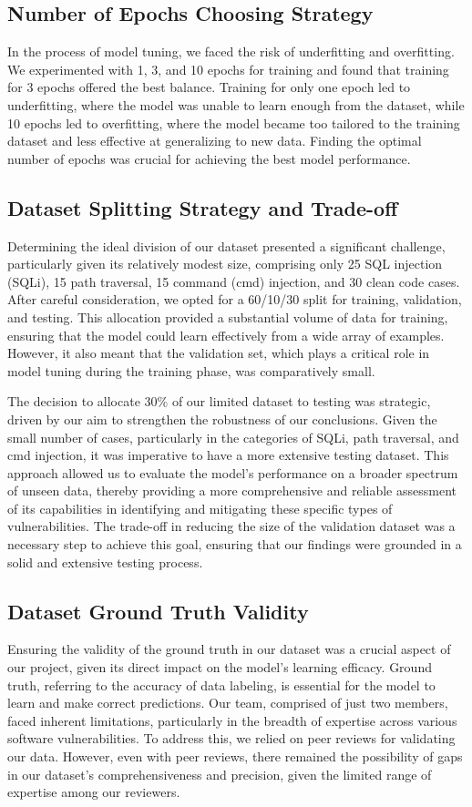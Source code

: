 \documentclass[acmsmall]{acmart}
\begin{document}
\subsection{Number of Epochs Choosing Strategy}
In the process of model tuning, we faced the risk of underfitting and overfitting. We experimented with 1, 3, and 10 epochs for training and found that training for 3 epochs offered the best balance. Training for only one epoch led to underfitting, where the model was unable to learn enough from the dataset, while 10 epochs led to overfitting, where the model became too tailored to the training dataset and less effective at generalizing to new data. Finding the optimal number of epochs was crucial for achieving the best model performance.

\subsection{Dataset Splitting Strategy and Trade-off}
Determining the ideal division of our dataset presented a significant challenge, particularly given its relatively modest size, comprising only 25 SQL injection (SQLi), 15 path traversal, 15 command (cmd) injection, and 30 clean code cases. After careful consideration, we opted for a 60/10/30 split for training, validation, and testing. This allocation provided a substantial volume of data for training, ensuring that the model could learn effectively from a wide array of examples. However, it also meant that the validation set, which plays a critical role in model tuning during the training phase, was comparatively small.

The decision to allocate 30\% of our limited dataset to testing was strategic, driven by our aim to strengthen the robustness of our conclusions. Given the small number of cases, particularly in the categories of SQLi, path traversal, and cmd injection, it was imperative to have a more extensive testing dataset. This approach allowed us to evaluate the model's performance on a broader spectrum of unseen data, thereby providing a more comprehensive and reliable assessment of its capabilities in identifying and mitigating these specific types of vulnerabilities. The trade-off in reducing the size of the validation dataset was a necessary step to achieve this goal, ensuring that our findings were grounded in a solid and extensive testing process.

\subsection{Dataset Ground Truth Validity}
Ensuring the validity of the ground truth in our dataset was a crucial aspect of our project, given its direct impact on the model's learning efficacy. Ground truth, referring to the accuracy of data labeling, is essential for the model to learn and make correct predictions. Our team, comprised of just two members, faced inherent limitations, particularly in the breadth of expertise across various software vulnerabilities. To address this, we relied on peer reviews for validating our data. However, even with peer reviews, there remained the possibility of gaps in our dataset's comprehensiveness and precision, given the limited range of expertise among our reviewers.
\end{document}
